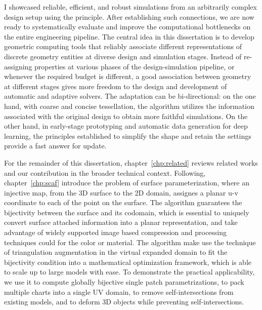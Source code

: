 I showcased reliable, efficient, and robust simulations from an arbitrarily complex design setup using the principle. After establishing such connections, we are now ready to systematically evaluate and improve the computational bottlenecks on the entire engineering pipeline.
The central idea in this dissertation is to develop geometric computing tools that reliably associate different representations of discrete geometry entities at diverse design and simulation stages. 
Instead of re-assigning properties at various phases of the design-simulation pipeline, or whenever the required budget is different, a good association between geometry at different stages gives more freedom to the design and development of automatic and adaptive solvers. The adaptation can be bi-directional: on the one hand, with coarse and concise tessellation, the algorithm utilizes the information associated with the original design to obtain more faithful simulations. On the other hand, in early-stage prototyping and automatic data generation for deep learning, the principles established to simplify the shape and retain the settings provide a fast answer for update. 

For the remainder of this dissertation, chapter~\ref*{chp:related} reviews related works and our contribution in the broader technical context. 
Following, chapter~\ref*{chp:scaf} introduce the problem of surface parameterization, where an injective map, from the 3D surface to the 2D domain, assignes a planar u-v coordinate to each of the point on the surface. The algorithm guarantees the bijectivity between the surface and its codomain, which is essential to uniquely convert surface attached information into a planar representation, and take advantage of widely supported image based compression and processing techniques could for the color or material. 
The algorithm make use the technique of triangulation augmentation in the virtual expanded domain to fit the bijectivity condition into a mathematical optimization framework, which is able to scale up to large models with ease. 
To demonstrate the practical applicability, we use it to compute globally bijective single patch parametrizations, to pack multiple charts into a single UV domain, to remove self-intersections from existing models, and to deform 3D objects while preventing self-intersections.


